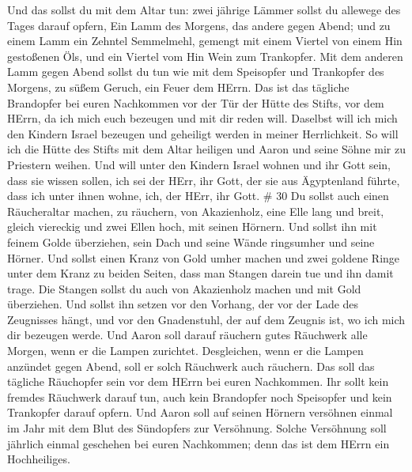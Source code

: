  Und das sollst du mit dem Altar tun: zwei jährige Lämmer
sollst du allewege des Tages darauf opfern,  Ein Lamm des
Morgens, das andere gegen Abend;  und zu einem Lamm ein
Zehntel Semmelmehl, gemengt mit einem Viertel von einem Hin gestoßenen
Öls, und ein Viertel vom Hin Wein zum Trankopfer.  Mit dem
anderen Lamm gegen Abend sollst du tun wie mit dem Speisopfer und
Trankopfer des Morgens, zu süßem Geruch, ein Feuer dem HErrn.
 Das ist das tägliche Brandopfer bei euren Nachkommen vor
der Tür der Hütte des Stifts, vor dem HErrn, da ich mich euch bezeugen
und mit dir reden will.  Daselbst will ich mich den Kindern
Israel bezeugen und geheiligt werden in meiner Herrlichkeit.
 So will ich die Hütte des Stifts mit dem Altar heiligen
und Aaron und seine Söhne mir zu Priestern weihen.  Und
will unter den Kindern Israel wohnen und ihr Gott sein, 
dass sie wissen sollen, ich sei der HErr, ihr Gott, der sie aus
Ägyptenland führte, dass ich unter ihnen wohne, ich, der HErr, ihr Gott.
\# 30  Du sollst auch einen Räucheraltar machen, zu
räuchern, von Akazienholz,  eine Elle lang und breit, gleich
viereckig und zwei Ellen hoch, mit seinen Hörnern.  Und
sollst ihn mit feinem Golde überziehen, sein Dach und seine Wände
ringsumher und seine Hörner. Und sollst einen Kranz von Gold umher
machen  und zwei goldene Ringe unter dem Kranz zu beiden
Seiten, dass man Stangen darein tue und ihn damit trage. 
Die Stangen sollst du auch von Akazienholz machen und mit Gold
überziehen.  Und sollst ihn setzen vor den Vorhang, der vor
der Lade des Zeugnisses hängt, und vor den Gnadenstuhl, der auf dem
Zeugnis ist, wo ich mich dir bezeugen werde.  Und Aaron soll
darauf räuchern gutes Räuchwerk alle Morgen, wenn er die Lampen
zurichtet.  Desgleichen, wenn er die Lampen anzündet gegen
Abend, soll er solch Räuchwerk auch räuchern. Das soll das tägliche
Räuchopfer sein vor dem HErrn bei euren Nachkommen.  Ihr
sollt kein fremdes Räuchwerk darauf tun, auch kein Brandopfer noch
Speisopfer und kein Trankopfer darauf opfern.  Und Aaron
soll auf seinen Hörnern versöhnen einmal im Jahr mit dem Blut des
Sündopfers zur Versöhnung. Solche Versöhnung soll jährlich einmal
geschehen bei euren Nachkommen; denn das ist dem HErrn ein Hochheiliges.


